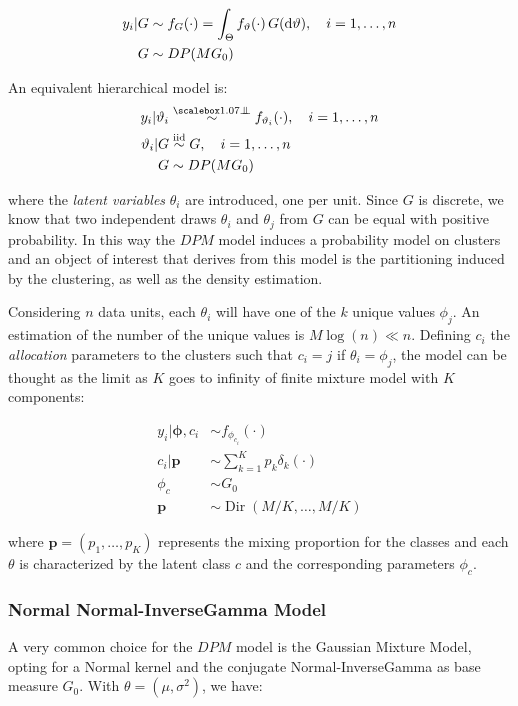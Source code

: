 \begin{align}
			y_i | G &\sim f_G(\cdot) = \int_\Theta f_{\vartheta}(\cdot) \, G(\mathrm d\vartheta), \quad i=1,\dots,n \\
			G &\sim DP(M G_0) \nonumber
\end{align}


An equivalent hierarchical model is:
\begin{align}
			y_i | \theta_i &\indsim f_{\theta_i}(\cdot), \quad i=1,\dots,n \\
			\theta_i | G &\iidsim G, \quad i=1,\dots,n \nonumber \\ 
			G &\sim DP(M G_0) \nonumber
\end{align}

where the \textit{latent variables} $\theta_i$ are introduced, one per unit. Since $G$ is discrete, we know that two independent draws $\theta_i$ and $\theta_j$ from $G$ can be equal with positive probability. In this way the $DPM$ model induces a probability model on clusters and an object of interest that derives from this model is the partitioning induced by the clustering, as well as the density estimation. 


Considering $n$ data units, each $\theta_i$ will have one of the $k$ unique values $\phi_{j}$. An estimation of the number of the unique values is $M\log(n) \ll n$. Defining  $c_i$ the \textit{allocation} parameters to the clusters such that $c_i = j$ if $\theta_i = \phi_j$, the model can be thought as the limit as $K$ goes to infinity of
finite mixture model with $K$ components:

\begin{align}
            	y_{i}|\mathbf{\phi},c_{i} &\sim f_{\phi_{c_{i}}}(\cdot) \\
            	c_{i}|\mathit{\mathbf{p}}&\sim \sum_{k=1}^K\mathit{p_k} \delta_k(\cdot) \nonumber \\
            	\phi_{c} & \sim G_{0} \nonumber \\
            	\mathbf{p} &\sim \operatorname{Dir}(M/K,\dots,M/K) \nonumber
\end{align}
        

where $\mathbf{p}=(p_1,\dots,p_K)$ represents the mixing proportion for the classes and each $\theta$ is characterized by the latent class $c$ and the corresponding parameters $\phi_c$.


\subsubsection{Normal Normal-InverseGamma Model}
A very common choice for the $DPM$ model is the Gaussian Mixture Model, opting for a Normal kernel and the conjugate Normal-InverseGamma as base measure $G_0$. With $\theta=(\mu,\sigma^2)$, we have:

